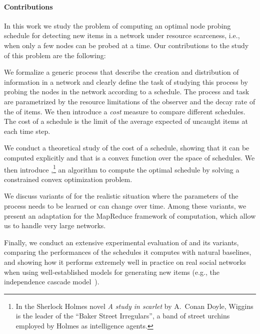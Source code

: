 
\paragraph*{Contributions}
In this work we study the problem of computing an optimal node probing schedule
for detecting new items in a network under resource scarceness, i.e., when only
a few nodes can be probed at a time. Our contributions to the study of this
problem are the following:

\begin{itemize*}
	\item We formalize a generic process that describe the creation and
		distribution of information in a network and clearly define the task of
		studying this process by probing the nodes in the network according to a
		schedule. The process and task are parametrized by the resource
		limitations of the observer and the decay rate of the  of
		items. We then introduce a \emph{cost} measure to compare different
		schedules. The cost of a schedule is the limit of the average expected
		 of uncaught items at each time step.
	\item We conduct a theoretical study of the cost of a schedule, showing that
		it can be computed explicitly and that is a convex function over the
		space of schedules. We then introduce \algoname,\footnote{In the Sherlock
			Holmes novel \emph{A study in scarlet} by A.~Conan Doyle, Wiggins is
			the leader of the ``Baker Street Irregulars'', a band of street
			urchins employed by Holmes as intelligence agents.} an algorithm to
		compute the optimal schedule by solving a constrained convex
		optimization problem.
	\item We discuss variants of \algoname for the realistic situation where
		the parameters of the process needs to be learned or can change over
		time. Among these variants, we present an adaptation for the MapReduce
		framework of computation, which allow us to handle very large networks.
	\item Finally, we conduct an extensive experimental evaluation of \algoname
		and its variants, comparing the performances of the schedules it
		computes with natural baselines, and showing how it performs extremely
		well in practice on real social networks when using well-established
		models for generating new items (e.g., the independence cascade
		model~\citemissing).
\end{itemize*}

